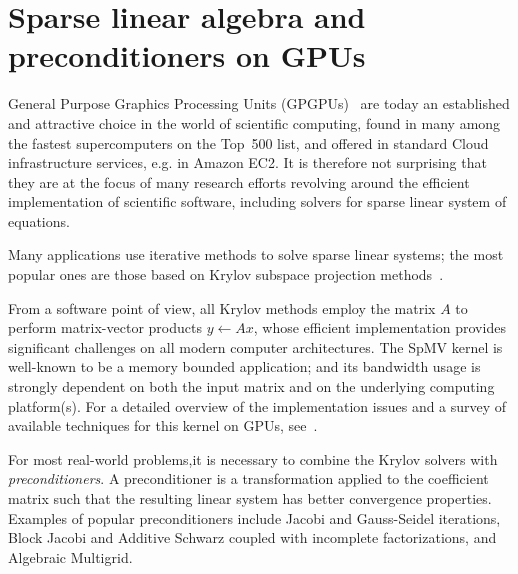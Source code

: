\section{Sparse linear algebra and preconditioners on GPUs}

General Purpose Graphics Processing Units (GPGPUs)~\cite{Luebke06}  
are today an established and attractive choice in the world of
scientific computing, found in many among the fastest supercomputers
on the Top~500 list, and offered in standard Cloud infrastructure
services, e.g. in  Amazon EC2. It is therefore not surprising that
they are at the focus of many research efforts revolving around the
efficient implementation of scientific software, including solvers for
sparse linear system of equations. 

Many applications use iterative methods to solve sparse linear
systems;  the most popular ones are those based on  Krylov subspace 
projection methods~\cite{MR1990645}. 

From a  software point of view, all Krylov methods employ the matrix $A$ 
to perform matrix-vector products  $y\gets Ax$, whose efficient
implementation provides significant challenges on all modern computer
architectures. 
The SpMV kernel is well-known to be a memory bounded application;
and  its bandwidth usage  is strongly dependent on both the input
matrix and on the underlying computing platform(s). For a detailed
overview of the implementation issues and a survey of available
techniques for this kernel on GPUs,
see~\cite{Filippone:2017:SMM:3034774.3017994}.   

For most real-world problems,it is necessary to combine the Krylov
solvers with  \emph{preconditioners}. A preconditioner is a
transformation applied to the coefficient  matrix such that the
resulting linear system has better convergence properties. Examples of
popular preconditioners include Jacobi and Gauss-Seidel iterations,
Block Jacobi and Additive Schwarz coupled with incomplete
factorizations,  and Algebraic Multigrid. 

